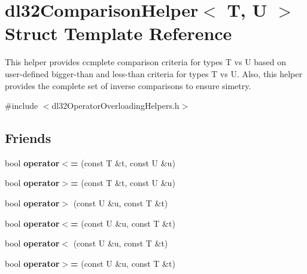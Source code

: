 \hypertarget{structdl32_comparison_helper}{\section{dl32\-Comparison\-Helper$<$ T, U $>$ Struct Template Reference}
\label{structdl32_comparison_helper}
}


This helper provides ccmplete comparison criteria for types T vs U based on user-\/defined bigger-\/than and less-\/than criteria for types T vs U. Also, this helper provides the complete set of inverse comparisons to ensure simetry.  




{\ttfamily \#include $<$dl32\-Operator\-Overloading\-Helpers.\-h$>$}

\subsection*{Friends}
\begin{DoxyCompactItemize}
\item 
\hypertarget{structdl32_comparison_helper_a979d5b504cbcec728e86c79d9ba5671e}{bool {\bfseries operator$<$=} (const T \&t, const U \&u)}\label{structdl32_comparison_helper_a979d5b504cbcec728e86c79d9ba5671e}

\item 
\hypertarget{structdl32_comparison_helper_ae12a39e256d7fcd621e488866ba63924}{bool {\bfseries operator$>$=} (const T \&t, const U \&u)}\label{structdl32_comparison_helper_ae12a39e256d7fcd621e488866ba63924}

\item 
\hypertarget{structdl32_comparison_helper_ad4c0736deed95e5cb4a18464e59e0118}{bool {\bfseries operator$>$} (const U \&u, const T \&t)}\label{structdl32_comparison_helper_ad4c0736deed95e5cb4a18464e59e0118}

\item 
\hypertarget{structdl32_comparison_helper_ab01843d56868acff1f25c70abc7428f6}{bool {\bfseries operator$<$=} (const U \&u, const T \&t)}\label{structdl32_comparison_helper_ab01843d56868acff1f25c70abc7428f6}

\item 
\hypertarget{structdl32_comparison_helper_af9e239e65355cd0e42c55b5b90bf7ddb}{bool {\bfseries operator$<$} (const U \&u, const T \&t)}\label{structdl32_comparison_helper_af9e239e65355cd0e42c55b5b90bf7ddb}

\item 
\hypertarget{structdl32_comparison_helper_a4a7a94a9acff35d76d79ed1598e98061}{bool {\bfseries operator$>$=} (const U \&u, const T \&t)}\label{structdl32_comparison_helper_a4a7a94a9acff35d76d79ed1598e98061}

\end{DoxyCompactItemize}


